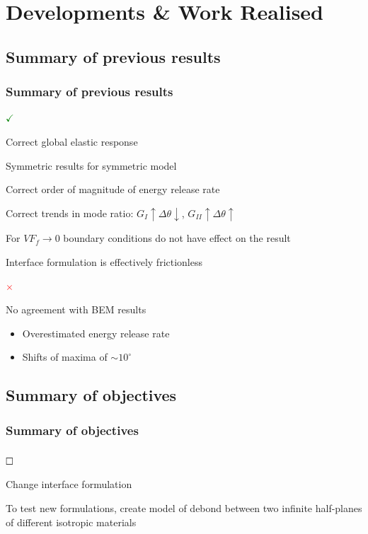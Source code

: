 \documentclass[first,firstsupp,lastsupp,handout,last,hyperref,table]{ETHclass}
\begin{document}
\section{Developments \& Work Realised}

\subsection[Previous results]{Summary of previous results}

\begin{frame}
\frametitle{Summary of previous results}
\vspace{-0.25cm}
\scriptsize
\begin{list}{\Large\textcolor{green}{$\mathbf{\checkmark}$}}{}  
\item Correct global elastic response
\item Symmetric results for symmetric model
\item Correct order of magnitude of energy release rate
\item Correct trends in mode ratio: $G_{I}\uparrow\Delta\theta\downarrow$, $G_{II}\uparrow\Delta\theta\uparrow$
\item For $VF_{f}\to 0$ boundary conditions do not have effect on the result
\item Interface formulation is effectively frictionless
\end{list}
\begin{list}{\Huge\textcolor{red}{$\mathbf{\times}$}}{}  
\item No agreement with BEM results
\begin{itemize}[label=]
\item Overestimated energy release rate
\item Shifts of maxima of $\sim 10^{\circ}$
\end{itemize}
\end{list}
\end{frame}

\subsection[Objectives]{Summary of objectives}

\begin{frame}
\frametitle{Summary of objectives}
\vspace{-0.5cm}
\vspace{-0.5cm}
\begin{list}{$\text{\rlap{\textcolor{white}{\huge$\mathbf{\checkmark}$}}}\square$}{}  
\item Change interface formulation
\item To test new formulations, create model of debond between two infinite half-planes of different isotropic materials
\end{list}
\end{frame}
\end{document}
